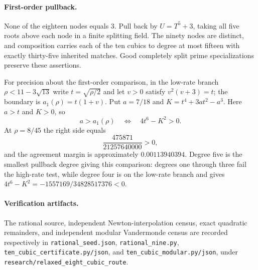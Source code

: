 \documentclass[10pt]{article}
\begin{document}
\paragraph{First-order pullback.}
None of the eighteen nodes equals $3$. Pull back by $U=T^5+3$, taking all five roots above each node in a finite splitting field. The ninety nodes are distinct, and composition carries each of the ten cubics to degree at most fifteen with exactly thirty-five inherited matches. Good completely split prime specializations preserve these assertions.

For precision about the first-order comparison, in the low-rate branch $\rho<11-3\sqrt{13}$ write $t=\sqrt{\rho/2}$ and let $v>0$ satisfy $v^2(v+3)=t$; the boundary is $a_1(\rho)=t(1+v)$. Put $a=7/18$ and $K=t^4+3at^2-a^3$. Here $a>t$ and $K>0$, so
\[
a>a_1(\rho)\quad\Longleftrightarrow\quad4t^6-K^2>0.
\]
At $\rho=8/45$ the right side equals
\[
\frac{475871}{21257640000}>0,
\]
and the agreement margin is approximately $0.00113940394$. Degree five is the smallest pullback degree giving this comparison: degrees one through three fail the high-rate test, while degree four is on the low-rate branch and gives $4t^6-K^2=-1557169/34828517376<0$.

\paragraph{Verification artifacts.}
{\small\raggedright The rational source, independent Newton-interpolation census, exact quadratic remainders, and independent modular Vandermonde census are recorded respectively in
\texttt{rational\_seed.json}, \texttt{rational\_nine.py},
\texttt{ten\_cubic\_certificate.py/json}, and
\texttt{ten\_cubic\_modular.py/json}, under
\texttt{research/relaxed\_eight\_cubic\_route}.\par}
\end{document}
